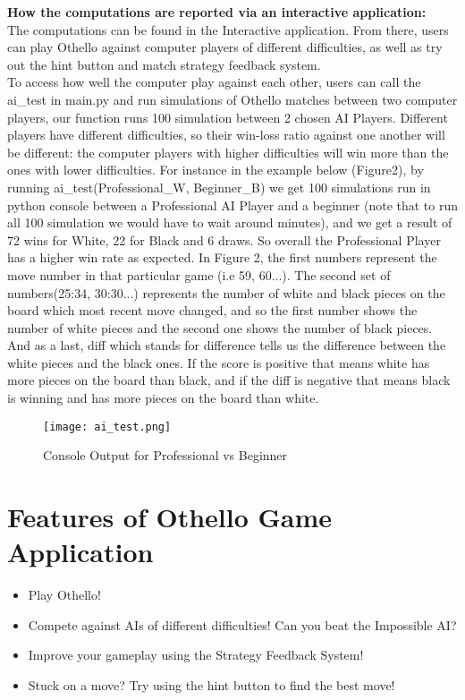\documentclass[fontsize=11pt]{article}
\begin{document}
\textbf{How the computations are reported via an interactive application:} \\

The computations can be found in the Interactive application. From there, users can play Othello against computer players of different difficulties, as well as try out the hint button and match strategy feedback system.\\ 

To access how well the computer play against each other, users can call the ai\_test in main.py and run simulations of Othello matches between two computer players, our function runs 100 simulation between 2 chosen AI Players. Different players have different difficulties, so their win-loss ratio against one another will be different: the computer players with higher difficulties will win more than the ones with lower difficulties. For instance in the example below (Figure2), by running ai\_test(Professional\_W, Beginner\_B) we get 100 simulations run in python console between a Professional AI Player and a beginner (note that to run all 100 simulation we would have to wait around minutes), and we get a result of 72 wins for White, 22 for Black and 6 draws.  So overall the Professional Player has a higher win rate as expected. In Figure 2, the first numbers represent the move number in that particular game (i.e 59, 60...). The second set of numbers(25:34, 30:30...) represents the number of white and black pieces on the board which most recent move changed, and so the first number shows the number of white pieces and the second one shows the number of black pieces. And as a last, diff which stands for difference tells us the difference between the white pieces and the black ones. If the score is positive that means white has more pieces on the board than black, and if the diff is negative that means black is winning and has more pieces on the board than white.
    \begin{figure}[h]
            \centering
            \texttt{[image: ai\_test.png]}
            \caption{Console Output for Professional vs Beginner}
            \label{fig:my_label}
        \end{figure}
\newpage

\section*{Features of Othello Game Application}
\begin{itemize}
    \item Play Othello!
    \item Compete against AIs of different difficulties! Can you beat the Impossible AI?
    \item Improve your gameplay using the Strategy Feedback System!
    \item Stuck on a move? Try using the hint button to find the best move!
\end{itemize}
\end{document}
